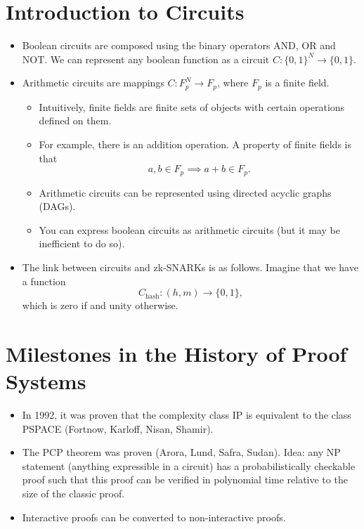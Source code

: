 \documentclass{article}
\begin{document}
\section{Introduction to Circuits}
\begin{itemize}
\item Boolean circuits are composed using the binary operators AND, OR and NOT. We can represent any boolean function as a circuit $C: \{0,1\}^N \longrightarrow \{0,1\}$.
\item Arithmetic circuits are mappings $C: F_p^N \longrightarrow F_p$, where $F_p$ is a finite field.
	\begin{itemize}
	\item Intuitively, finite fields are finite sets of objects with certain operations defined on them.
	\item For example, there is an addition operation. A property of finite fields is that
		\begin{equation}
		a, b \in F_p \implies a+b \in F_p.
		\end{equation}
	\item Arithmetic circuits can be represented using directed acyclic graphs (DAGs).
	\item You can express boolean circuits as arithmetic circuits (but it may be inefficient to do so).
	\end{itemize}
\item The link between circuits and zk-SNARKs is as follows. Imagine that we have a function
	\begin{equation}
	C_{\text{hash}}: (h, m) \longrightarrow \{0,1\},
	\end{equation}
	which is zero if and unity otherwise.
\end{itemize}

\section{Milestones in the History of Proof Systems}
\begin{itemize}
\item In 1992, it was proven that the complexity class IP is equivalent to the class PSPACE (Fortnow, Karloff, Nisan, Shamir).
\item The PCP theorem was proven (Arora, Lund, Safra, Sudan). Idea: any NP statement (anything expressible in a circuit) has a probabilistically checkable proof such that this proof can be verified in polynomial time relative to the size of the classic proof.
\item Interactive proofs can be converted to non-interactive proofs.
\end{itemize}
\end{document}
